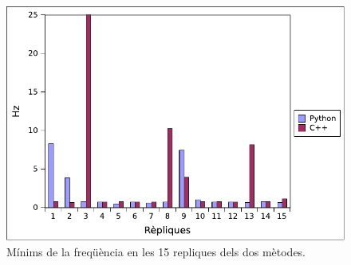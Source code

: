 \documentclass[12pt,a4paper,final,twoside]{article}
\begin{document}
\begin{figure}[h!]
	\centering
    \includegraphics[scale=1]{images/MinJoint.pdf}
	 \caption{Mínims de la freqüència en les 15 repliques dels dos mètodes.}
  \label{fig:MinJoint}
\end{figure}
%
%
\end{document}
